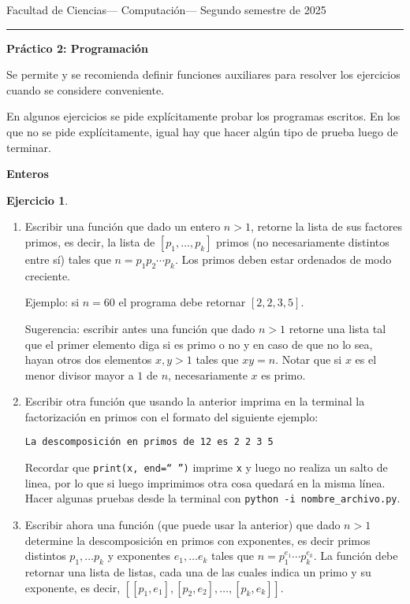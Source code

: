 \documentclass[a4paper,12pt]{book}
\theoremstyle{definition}
\newtheorem{ejercicio}{Ejercicio}
\begin{document}
	
	\noindent
	\centerline{\sc
		Facultad de Ciencias\hfill---\hfill
		Computación\hfill---\hfill
		Segundo semestre de 2025}\smallbreak\hrule
	
	\bigbreak
	\centerline{\Large\textbf{Práctico 2: Programación}}
	\bigbreak
	
	Se permite y se recomienda definir funciones auxiliares para resolver los ejercicios cuando se considere conveniente.
	
	En algunos ejercicios se pide explícitamente probar los programas escritos. En los que no se pide explícitamente, igual hay que hacer algún tipo de prueba luego de terminar.
	\begin{center}
		{\textbf{Enteros}}
	\end{center}
	
	\begin{ejercicio}
		\begin{enumerate}
			\item Escribir una función que dado un entero $n>1$, retorne la lista de sus factores primos, es decir, la lista de $[p_1,\dots,p_k]$ primos (no necesariamente distintos entre sí) tales que $n=p_1p_2\cdots p_k$. Los primos deben estar ordenados de modo creciente.
			
			Ejemplo: si $n=60$ el programa debe retornar $[2,2,3,5]$.
			
			Sugerencia: escribir antes una función que dado $n>1$ retorne una lista tal que el primer elemento diga si es primo o no y en caso de que no lo sea, hayan otros dos elementos $x,y>1$ tales que $xy=n$. Notar que si $x$ es el menor divisor mayor a $1$ de $n$, necesariamente $x$ es primo.
			
			\item Escribir otra función que usando la anterior imprima en la terminal la factorización en primos con el formato del siguiente ejemplo:
			\begin{center}
				{\tt La descomposición en primos de 12 es 2 2 3 5}
			\end{center}
				
				
			Recordar que {\tt print(x, end=`` '')} imprime {\tt x} y luego no realiza un salto de linea, por lo que si luego imprimimos otra cosa quedará en la misma línea.
			Hacer algunas pruebas desde la terminal con {\tt python -i nombre\_archivo.py}.
			
			\item Escribir ahora una función (que puede usar la anterior) que dado $n>1$ determine la descomposición en primos con exponentes, es decir primos distintos $p_1,\dots p_k$ y exponentes $e_1,\dots e_k$ tales que $n=p_1^{e_1}\cdots p_k^{e_k}$. La función debe retornar una lista de listas, cada una de las cuales indica un primo y su exponente, es decir, $[[p_1,e_1],[p_2,e_2],\dots,[p_k,e_k]]$.
			

\end{enumerate}
\end{ejercicio}
\end{document}

